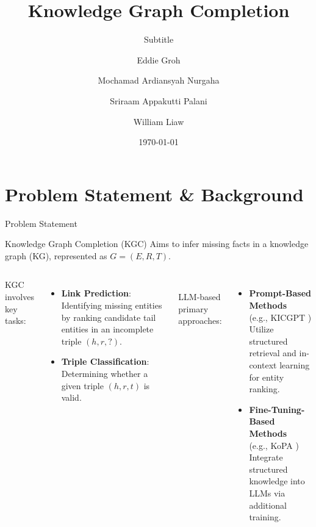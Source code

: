 \documentclass[aspectratio=169,xcolor=dvipsnames]{beamer}
\title{Knowledge Graph Completion}
\subtitle{Subtitle}
\author{Eddie Groh \and Mochamad Ardiansyah Nurgaha \and Sriraam Appakutti Palani \and William Liaw}
\institute[Team: AWESome]
{
    Mehwish ALAM\\
    Associate Professor
    \and
    Language Models and Structured Data\\
}
\date{\today}
\begin{document}
\begin{frame}
    \titlepage
\end{frame}


\section{Problem Statement \& Background}
\begin{frame}{Problem Statement}
    \begin{block}{Knowledge Graph Completion (KGC)}
        Aims to infer missing facts in a knowledge graph (KG), represented as \( G = (E, R, T) \).
    \end{block}

    \begin{columns}[c]
        KGC involves key tasks:
        \begin{itemize}
            \item \textbf{Link Prediction}: Identifying missing entities by ranking candidate tail entities in an incomplete triple \( (h, r, ?) \).
            \item \textbf{Triple Classification}: Determining whether a given triple \( (h, r, t) \) is valid.
        \end{itemize}
        \\LLM-based primary approaches:
        \begin{itemize}
            \item \textbf{Prompt-Based Methods} \\(e.g., KICGPT \cite{wei2023kicgpt})\\ Utilize structured retrieval and in-context learning for entity ranking.
            \item \textbf{Fine-Tuning-Based Methods} \\(e.g., KoPA \cite{qin2023kopa})\\ Integrate structured knowledge into LLMs via additional training.
        \end{itemize}
    \end{columns}
\end{frame}

\end{document}
